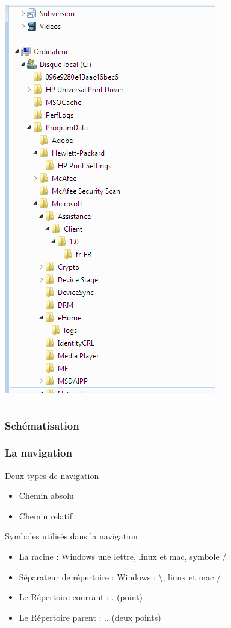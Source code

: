 \documentclass{beamer}
\begin{document}
\begin{frame}
\begin{columns}
\begin{column}[c]{5cm}
				\includegraphics[scale=0.25]{image/ArboWin.png}
			\end{column}
		\end{columns}
\end{frame}

\begin{frame}
		\frametitle{Schématisation}
		\begin{center}
			
		\end{center}
\end{frame}	

\begin{frame}
		\frametitle{La navigation}
		\begin{block}{Deux types de navigation}
			\begin{itemize}
				\item Chemin absolu
				\item Chemin relatif
			\end{itemize}
		\end{block}
		\begin{block}{Symboles utilisés dans la navigation}
			\begin{itemize}
				\item La racine : Windows une lettre, linux et mac, symbole / 
				\item Séparateur de répertoire : Windows : \textbackslash, linux et mac  /
				\item Le Répertoire courrant : . (point)
				\item Le Répertoire parent : .. (deux points)
			\end{itemize}
		\end{block}
\end{frame}
\end{document}
